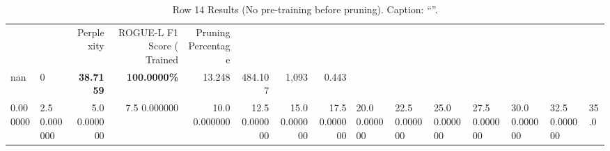 \begin{table}
\caption{Row 14 Results (No pre-training before pruning). \ifshowcaption{}Caption: ``''.\fi}
\label{tab:evaluation-pipeline-14-untrained}
\begin{tabular}{llrrrrrr}
 &  & Perplexity & ROGUE-L F1 Score (%
Trained & Pruning Percentage &  &  &  &  &  &  \\
nan & 0 & \bfseries 38.7159 & \bfseries 100.0000\% & 13.248 & 484.107 & 1,093 & 0.443 \\
0.000000 & 2.5%
0.000000 & 5.0%
0.000000 & 7.5%
0.000000 & 10.0%
0.000000 & 12.5%
0.000000 & 15.0%
0.000000 & 17.5%
0.000000 & 20.0%
0.000000 & 22.5%
0.000000 & 25.0%
0.000000 & 27.5%
0.000000 & 30.0%
0.000000 & 32.5%
0.000000 & 35.0%

\end{tabular}
\end{table}
